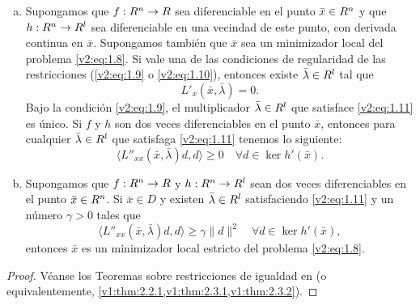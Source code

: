 \begin{theorem}\label{v2:thm:1.2.2}
    \begin{enumerate}[(a)]
        \item Supongamos que $f : R^n \to R$ sea diferenciable en el punto $\bar{x} \in R^n$ y que $h : R^n \to R^l$ sea diferenciable en una vecindad de este punto, con derivada continua en $\bar{x}$. Supongamos también que $\bar{x}$ sea un minimizador local del problema \eqref{v2:eq:1.8}. 
        Si vale una de las condiciones de regularidad de las restricciones (\eqref{v2:eq:1.9} o \eqref{v2:eq:1.10}), entonces existe $\bar{\lambda} \in R^l$ tal que
        \begin{equation}
            L'_x(\bar{x}, \bar{\lambda}) = 0.
            \label{v2:eq:1.11}
        \end{equation}
        Bajo la condición \eqref{v2:eq:1.9}, el multiplicador $\bar{\lambda} \in R^l$ que satisface \eqref{v2:eq:1.11} es único.
        Si $f$ y $h$ son dos veces diferenciables en el punto $\bar{x}$, entonces para cualquier $\bar{\lambda} \in R^l$ que satisfaga \eqref{v2:eq:1.11} tenemos lo siguiente:
        \begin{equation}
            \langle L''_{xx}(\bar{x}, \bar{\lambda})d, d \rangle \ge 0 \quad \forall d \in \ker h'(\bar{x}).
            \label{v2:eq:1.12}
        \end{equation}
        
        \item Supongamos que $f : R^n \to R$ y $h : R^n \to R^l$ sean dos veces diferenciables en el punto $\bar{x} \in R^n$.
        Si $\bar{x} \in D$ y existen $\bar{\lambda} \in R^l$ satisfaciendo \eqref{v2:eq:1.11} y un número $\gamma > 0$ tales que
        \begin{equation}
            \langle L''_{xx}(\bar{x}, \bar{\lambda})d, d \rangle \ge \gamma \|d\|^2 \quad \forall d \in \ker h'(\bar{x}),
            \label{v2:eq:1.13}
        \end{equation}
        entonces $\bar{x}$ es un minimizador local estricto del problema \eqref{v2:eq:1.8}.
    \end{enumerate}
\end{theorem}

\begin{proof}
    Véanse los Teoremas sobre restricciones de igualdad en \cite{izmailov2020otimizacaovolume1} (o equivalentemente, \cref{v1:thm:2.2.1,v1:thm:2.3.1,v1:thm:2.3.2}).
\end{proof}

